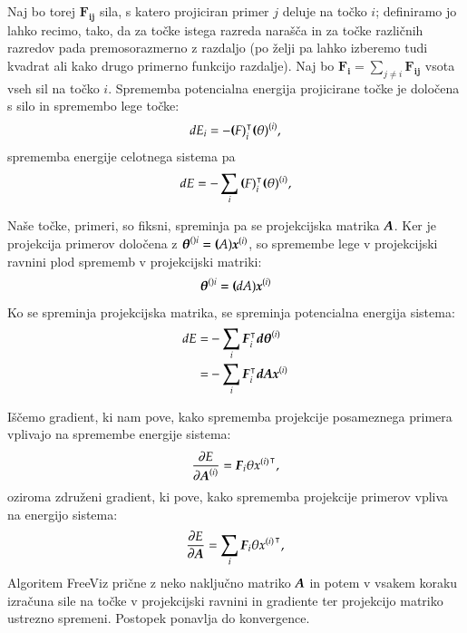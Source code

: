 Naj bo torej $\mathbf{F_{ij}}$ sila, s katero projiciran primer $j$ deluje na točko $i$; definiramo jo lahko recimo, tako, da za točke istega razreda narašča in za točke različnih razredov pada premosorazmerno z razdaljo (po želji pa lahko izberemo tudi kvadrat ali kako drugo primerno funkcijo razdalje). Naj bo $\mathbf{F_i} = \sum_{j\ne i} \mathbf{F_{ij}}$ vsota vseh sil na točko $i$. Sprememba potencialna energija projicirane točke je določena s silo in spremembo lege točke:
\begin{equation}
  \nonumber
  dE_i=-\boldsymbol{(}F)_i^\intercal \boldsymbol{(}\theta)^{(i)},
\end{equation}
%
sprememba energije celotnega sistema pa
\begin{equation}
  \nonumber
  dE=-\sum_i\boldsymbol{(}F)_i^\intercal\boldsymbol{(}\theta)^{(i)},
\end{equation}

Naše točke, primeri, so fiksni, spreminja pa se projekcijska matrika $\boldsymbol{A}$. Ker je projekcija primerov določena z $\boldsymbol{\theta}^{()i}=\boldsymbol{(}A)\boldsymbol{x}^{(i)}$, so spremembe lege v projekcijski ravnini plod sprememb v projekcijski matriki:
\begin{equation}
  \nonumber
  \boldsymbol{\theta}^{()i}=\boldsymbol{(}dA)\boldsymbol{x}^{(i)}
\end{equation}
%
Ko se spreminja projekcijska matrika, se spreminja potencialna energija sistema:
\begin{equation}
  \begin{split}
    \nonumber
    dE = & -\sum_i \boldsymbol{F}_i^\intercal \boldsymbol{d\theta}^{(i)} \\
    \nonumber
    = & -\sum_i \boldsymbol{F}_i^\intercal \boldsymbol{dA}\boldsymbol{x}^{(i)}
  \end{split}
\end{equation}
%

Iščemo gradient, ki nam pove, kako sprememba projekcije posameznega primera vplivajo na spremembe energije sistema:
\begin{equation}
  \frac{\partial E}{\partial \boldsymbol{A}^{(i)}} = \boldsymbol{F}_i{\theta{x}^{(i)}}^\intercal,
\end{equation}
oziroma združeni gradient, ki pove, kako sprememba projekcije primerov vpliva na energijo sistema:
\begin{equation}
  \frac{\partial E}{\partial \boldsymbol{A}} = \sum_i\boldsymbol{F}_i{\theta{x}^{(i)}}^\intercal,
\end{equation}
%
Algoritem FreeViz prične z neko naključno matriko $\boldsymbol{A}$ in potem v vsakem koraku izračuna sile na točke v projekcijski ravnini in gradiente ter projekcijo matriko ustrezno spremeni. Postopek ponavlja do konvergence.

